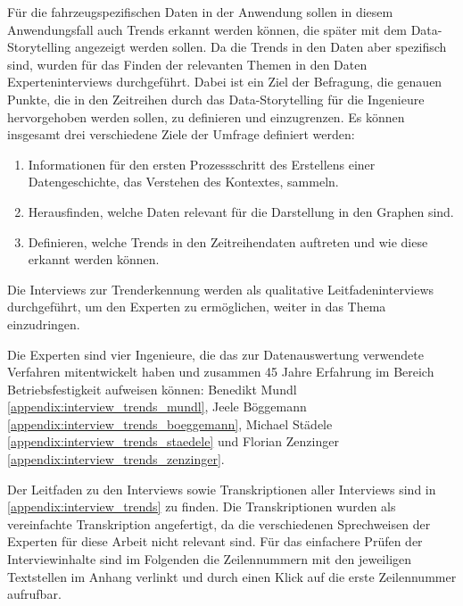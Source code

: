 Für die fahrzeugspezifischen Daten in der Anwendung sollen in diesem Anwendungsfall auch Trends erkannt werden können, die später mit dem Data-Storytelling angezeigt werden sollen. Da die Trends in den Daten aber spezifisch sind, wurden für das Finden der relevanten Themen in den Daten Experteninterviews durchgeführt. Dabei ist ein Ziel der Befragung, die genauen Punkte, die in den Zeitreihen durch das Data-Storytelling für die Ingenieure hervorgehoben werden sollen, zu definieren und einzugrenzen. Es können insgesamt drei verschiedene Ziele der Umfrage definiert werden:
\begin{enumerate}
    \item Informationen für den ersten Prozessschritt des Erstellens einer Datengeschichte, das Verstehen des Kontextes, sammeln.
    \item Herausfinden, welche Daten relevant für die Darstellung in den Graphen sind. %
    \item Definieren, welche Trends in den Zeitreihendaten auftreten und wie diese erkannt werden können.
\end{enumerate}

Die Interviews zur Trenderkennung werden als qualitative Leitfadeninterviews \cite{Engineering.2018} durchgeführt, um den Experten zu ermöglichen, weiter in das Thema einzudringen.

Die Experten sind vier Ingenieure, die das zur Datenauswertung verwendete Verfahren mitentwickelt haben und zusammen 45 Jahre Erfahrung im Bereich Betriebsfestigkeit aufweisen können: Benedikt Mundl \ref{appendix:interview_trends_mundl}, Jeele Böggemann \ref{appendix:interview_trends_boeggemann}, Michael Städele \ref{appendix:interview_trends_staedele} und Florian Zenzinger \ref{appendix:interview_trends_zenzinger}.

Der Leitfaden zu den Interviews sowie Transkriptionen aller Interviews sind in \ref{appendix:interview_trends} zu finden. Die Transkriptionen wurden als vereinfachte Transkription angefertigt, da die verschiedenen Sprechweisen der Experten für diese Arbeit nicht relevant sind. Für das einfachere Prüfen der Interviewinhalte sind im Folgenden die Zeilennummern mit den jeweiligen Textstellen im Anhang verlinkt und durch einen Klick auf die erste Zeilennummer aufrufbar.

